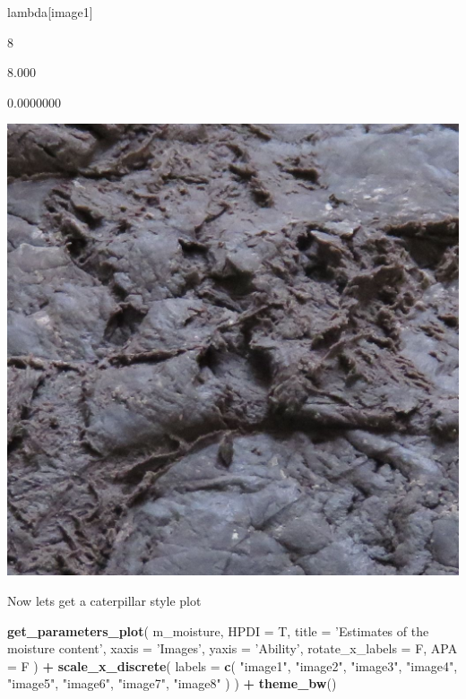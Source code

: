 \documentclass[
]{book}
\newenvironment{Shaded}{\begin{snugshade}}{\end{snugshade}}
\newcommand{\DataTypeTok}[1]{\textcolor[rgb]{0.13,0.29,0.53}{#1}}
\newcommand{\KeywordTok}[1]{\textcolor[rgb]{0.13,0.29,0.53}{\textbf{#1}}}
\newcommand{\NormalTok}[1]{#1}
\newcommand{\OperatorTok}[1]{\textcolor[rgb]{0.81,0.36,0.00}{\textbf{#1}}}
\newcommand{\StringTok}[1]{\textcolor[rgb]{0.31,0.60,0.02}{#1}}
\begin{document}
lambda{[}image1{]}

8

8.000

0.0000000

\includegraphics{data/moisture/Stimuli/image01.jpg}

Now lets get a caterpillar style plot

\begin{Shaded}
\begin{Highlighting}[]
\KeywordTok{get_parameters_plot}\NormalTok{(}
\NormalTok{  m_moisture,}
  \DataTypeTok{HPDI =}\NormalTok{ T,}
  \DataTypeTok{title =} \StringTok{'Estimates of the moisture content'}\NormalTok{,}
  \DataTypeTok{xaxis =} \StringTok{'Images'}\NormalTok{,}
  \DataTypeTok{yaxis =} \StringTok{'Ability'}\NormalTok{,}
  \DataTypeTok{rotate_x_labels =}\NormalTok{ F,}
  \DataTypeTok{APA =}\NormalTok{ F}
\NormalTok{) }\OperatorTok{+}\StringTok{ }\KeywordTok{scale_x_discrete}\NormalTok{(}
  \DataTypeTok{labels =} \KeywordTok{c}\NormalTok{(}
    \StringTok{"image1"}\NormalTok{,}
    \StringTok{"image2"}\NormalTok{,}
    \StringTok{"image3"}\NormalTok{,}
    \StringTok{"image4"}\NormalTok{,}
    \StringTok{"image5"}\NormalTok{,}
    \StringTok{"image6"}\NormalTok{,}
    \StringTok{"image7"}\NormalTok{,}
    \StringTok{"image8"}
\NormalTok{  )}
\NormalTok{) }\OperatorTok{+}\StringTok{ }\KeywordTok{theme_bw}\NormalTok{()}
\end{Highlighting}
\end{Shaded}
\end{document}

